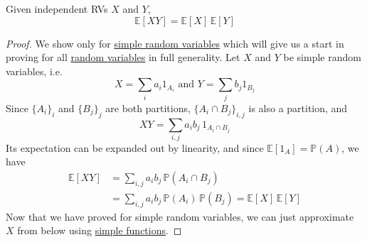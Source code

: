   \begin{theorem}
    \label{thm:expectation-of-independent-events}
    Given independent RVs $X$ and $Y$, 
    \begin{equation}
      \mathbb{E}[X Y] = \mathbb{E}[X] \, \mathbb{E}[Y]
    \end{equation}
  \end{theorem}
  \begin{proof}
    We show only for \hyperref[def:simple-random-variable]{simple random variables} which will give us a start in proving for all \hyperref[def:random-variable]{random variables} in full generality. Let $X$ and $Y$ be simple random variables, i.e. 
    \begin{equation}
      X = \sum_i a_i 1_{A_i} \text{ and } Y = \sum_j b_j 1_{B_j}
    \end{equation}
    Since $\{A_i\}_i$ and $\{B_j\}_j$ are both partitions, $\{A_i \cap B_j\}_{i, j}$ is also a partition, and 
    \begin{equation}
      X Y = \sum_{i, j} a_i b_j \, 1_{A_i \cap B_j}
    \end{equation}
    Its expectation can be expanded out by linearity, and since $\mathbb{E}[ 1_{A} ] = \mathbb{P}(A)$, we have
    \begin{align*}
      \mathbb{E}[X Y] & = \sum_{i, j} a_i b_j \, \mathbb{P}(A_i \cap B_j) \\
      & = \sum_{i, j} a_i b_j \, \mathbb{P}(A_i)\, \mathbb{P}(B_j) = \mathbb{E}[X] \, \mathbb{E}[Y]
    \end{align*}
    Now that we have proved for simple random variables, we can just approximate $X$ from below using \hyperref[mt-def:simple-functions]{simple functions}. 
  \end{proof}

